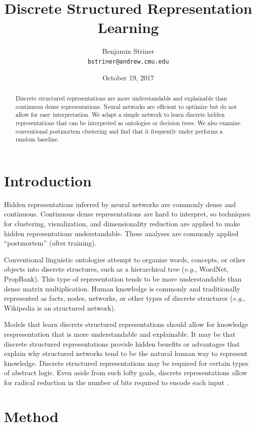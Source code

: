 \documentclass[11pt,letterpaper]{article}
\title{Discrete Structured Representation Learning}
\author{Benjamin Striner \\
  {\tt bstriner@andrew.cmu.edu} \\}
\date{October 19, 2017}
\begin{document}
\maketitle
\begin{abstract}
Discrete structured representations are more understandable and explainable than continuous dense representations. Neural networks are efficient to optimize but do not allow for easy interpretation. We adapt a simple network to learn  discrete hidden representations that can be interpreted as ontologies or decision trees. We also examine conventional postmortem clustering and find that it frequently under performs a random baseline.
\end{abstract}

\section{Introduction}

Hidden representations inferred by neural networks are commonly dense and continuous. Continuous dense representations are hard to interpret, so techniques for clustering, visualization, and dimensionality reduction are applied to make hidden representations understandable. These analyses are commonly applied ``postmortem'' (after training).

Conventional linguistic ontologies attempt to organize words, concepts, or other objects into discrete structures, such as a hierarchical tree (\textit{e.g.}, WordNet, PropBank). This type of representation tends to be more understandable than dense matrix multiplication. Human knowledge is commonly and traditionally represented as facts, nodes, networks, or other types of discrete structures (\textit{e.g.}, Wikipedia is an structured network).

Models that learn discrete structured representations should allow for knowledge respresentation that is more understandable and explainable. It may be that discrete structured representations provide hidden benefits or advantages that explain why structured networks tend to be the natural human way to represent knowledge. Discrete structured representations may be required for certain types of abstract logic. Even aside from such lofty goals, discrete representations allow for radical reduction in the number of bits required to encode each input \cite{Hu17}.

\section{Method}
\end{document}
